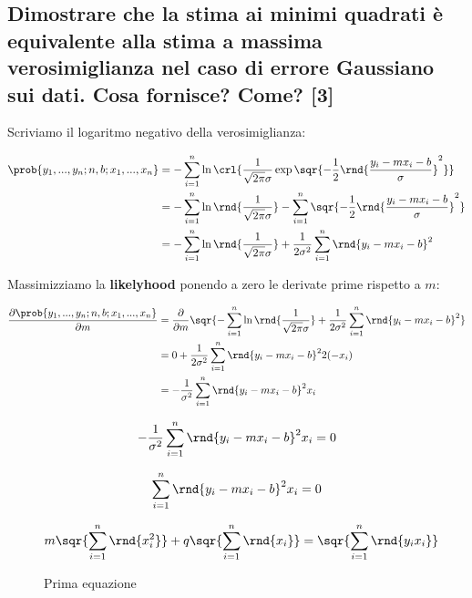\documentclass[\main/main.tex]{subfiles}
\begin{document}
\subsection{Dimostrare che la stima ai minimi quadrati è equivalente alla stima a massima verosimiglianza nel caso di errore Gaussiano sui dati. Cosa fornisce? Come? [3]}
Scriviamo il logaritmo negativo della verosimiglianza:

\begin{align*}
  \prob{y_1,...,y_n; n, b; x_1, ..., x_n } & =
  - \sum_{i=1}^n
  \ln \crl{
    \frac{1}{\sqrt{2\pi}\sigma}
    \exp \sqr{
      -\frac{1}{2} \rnd{\frac{ y_i - mx_i - b}{\sigma} }^2
    }
  }                                            \\
                                           & =
  - \sum_{i=1}^n \ln
  \rnd{ \frac{1}{\sqrt{2\pi}\sigma} }
  - \sum_{i=1}^n
  \sqr{
    -\frac{1}{2} \rnd{\frac{ y_i - mx_i - b}{\sigma} }^2
  }                                            \\
                                           & =
  - \sum_{i=1}^n \ln
  \rnd{ \frac{1}{\sqrt{2\pi}\sigma} }
  + \frac{1}{2\sigma^2} \sum_{i=1}^n
  \rnd{y_i - mx_i - b }^2
\end{align*}

Massimizziamo la \textbf{likelyhood} ponendo a zero le derivate prime rispetto a $m$:

\begin{align*}
  \frac{\partial \prob{y_1,...,y_n; n, b; x_1, ..., x_n }}{\partial m} & = \frac{\partial}{\partial m} \sqr{ - \sum_{i=1}^n \ln
    \rnd{ \frac{1}{\sqrt{2\pi}\sigma} }
    + \frac{1}{2\sigma^2} \sum_{i=1}^n
    \rnd{y_i - mx_i - b }^2
  }                                                                                                                                              \\
                                                                       & = 0 + \frac{1}{2\sigma^2} \sum_{i=1}^n \rnd{y_i - mx_i - b }^2 2 (-x_i) \\
                                                                       & = -\frac{1}{\sigma^2} \sum_{i=1}^n \rnd{y_i - mx_i - b }^2  x_i
\end{align*}

\[
  -\frac{1}{\sigma^2} \sum_{i=1}^n \rnd{y_i - mx_i - b }^2  x_i = 0
\]

\[
  \sum_{i=1}^n \rnd{y_i - mx_i - b }^2  x_i = 0
\]

\begin{figure}[H]
  \[
    m\sqr{ \sum_{i=1}^n \rnd{x_i^2 } } + q \sqr{ \sum_{i=1}^n \rnd{x_i } } = \sqr{ \sum_{i=1}^n \rnd{y_i x_i } }
  \]
  \caption{Prima equazione}
\end{figure}
\end{document}
